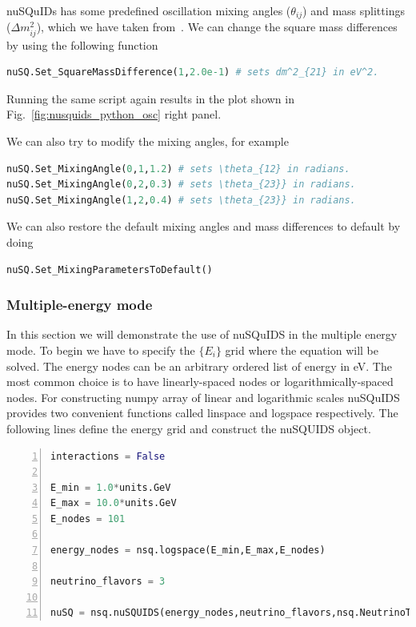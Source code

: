 \documentclass[3p,12pt]{elsarticle}
\newcommand{\ttf}{\ttfamily}
\begin{document}
nuSQuIDs has some predefined oscillation mixing angles ($\theta_{ij}$) and mass splittings ($\Delta m^2_{ij}$),
which we have taken from~\cite{nufit}.
We can change the square mass differences by using the following function
\begin{lstlisting}[language=Python, breaklines=true]
nuSQ.Set_SquareMassDifference(1,2.0e-1) # sets dm^2_{21} in eV^2.
\end{lstlisting}

Running the same script again results in the plot shown in Fig.~\ref{fig:nusquids_python_osc} right panel.

We can also try to modify the mixing angles, for example
\begin{lstlisting}[language=Python, breaklines=true]
nuSQ.Set_MixingAngle(0,1,1.2) # sets \theta_{12} in radians.
nuSQ.Set_MixingAngle(0,2,0.3) # sets \theta_{23}} in radians.
nuSQ.Set_MixingAngle(1,2,0.4) # sets \theta_{23}} in radians.
\end{lstlisting}
We can also restore the default mixing angles and mass differences to default by doing
\begin{lstlisting}[language=Python, breaklines=true]
nuSQ.Set_MixingParametersToDefault()
\end{lstlisting}

\subsubsection{Multiple-energy mode}

In this section we will demonstrate the use of {\ttf nuSQuIDS} in the multiple energy mode.
To begin we have to specify the $\{E_i\}$ grid where the equation will be solved.
The energy nodes can be an arbitrary ordered list of energy in eV.
The most common choice is to have linearly-spaced nodes or logarithmically-spaced nodes.
For constructing numpy array of linear and logarithmic scales nuSQuIDS provides two
 convenient functions called {\ttf linspace} and {\ttf logspace }respectively. The 
following lines define the energy grid and construct the nuSQUIDS object.

\begin{lstlisting}[language=Python, frame=leftline, numbers=left, breaklines=true]
interactions = False

E_min = 1.0*units.GeV
E_max = 10.0*units.GeV
E_nodes = 101

energy_nodes = nsq.logspace(E_min,E_max,E_nodes)

neutrino_flavors = 3

nuSQ = nsq.nuSQUIDS(energy_nodes,neutrino_flavors,nsq.NeutrinoType.neutrino,interactions)
\end{lstlisting}
\end{document}
